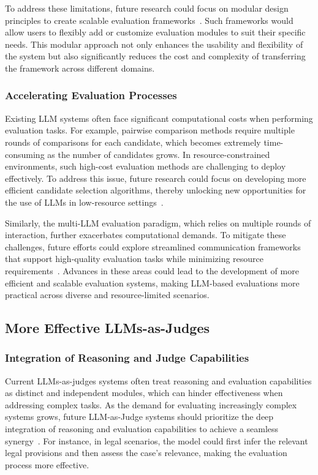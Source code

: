 To address these limitations, future research could focus on modular design principles to create scalable evaluation frameworks~\cite{xu2024perfect}. Such frameworks would allow users to flexibly add or customize evaluation modules to suit their specific needs. This modular approach not only enhances the usability and flexibility of the system but also significantly reduces the cost and complexity of transferring the framework across different domains.

\subsubsection{Accelerating Evaluation Processes}


Existing LLM systems often face significant computational costs when performing evaluation tasks. For example, pairwise comparison methods require multiple rounds of comparisons for each candidate, which becomes extremely time-consuming as the number of candidates grows.  In resource-constrained environments, such high-cost evaluation methods are challenging to deploy effectively. To address this issue, future research could focus on developing more efficient candidate selection algorithms, thereby unlocking new opportunities for the use of LLMs in low-resource settings~\cite{lee2024aligning,liu2024aligning}.

Similarly, the multi-LLM evaluation paradigm, which relies on multiple rounds of interaction, further exacerbates computational demands. To mitigate these challenges, future efforts could explore streamlined communication frameworks that support high-quality evaluation tasks while minimizing resource requirements~\cite{chen2024internet}. Advances in these areas could lead to the development of more efficient and scalable evaluation systems, making LLM-based evaluations more practical across diverse and resource-limited scenarios.

\subsection{More Effective LLMs-as-Judges}
\label{sec:more-Effective}

\subsubsection{Integration of Reasoning and Judge Capabilities}

Current LLMs-as-judges systems often treat reasoning and evaluation capabilities as distinct and independent modules, which can hinder effectiveness when addressing complex tasks. As the demand for evaluating increasingly complex systems grows, future LLM-as-Judge systems should prioritize the deep integration of reasoning and evaluation capabilities to achieve a seamless synergy~\cite{zhuo2023ice,yi2024protocollm,stephan2024calculation}. For instance, in legal scenarios, the model could first infer the relevant legal provisions and then assess the case's relevance, making the evaluation process more effective.

